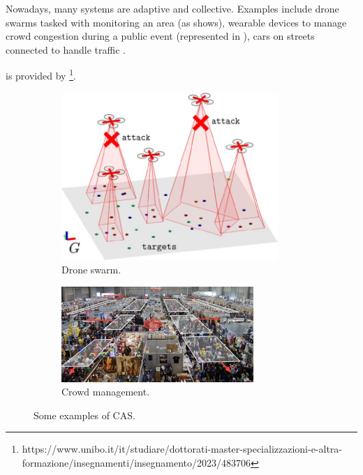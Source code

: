\documentclass[12pt,a4paper,openright,twoside]{book}
\begin{document}
Nowadays, many systems are adaptive and collective. Examples include drone swarms tasked with monitoring an area (as  shows),
wearable devices to manage crowd congestion during a public event (represented in ), cars on streets connected to handle traffic \cite{DBLP:journals/sttt/NicolaJW20}.

 is provided by \footnote{https://www.unibo.it/it/studiare/dottorati-master-specializzazioni-e-altra-formazione/insegnamenti/insegnamento/2023/483706}.

\begin{figure}[h]
  \centering
  \begin{subfigure}[b]{0.49\textwidth}
    \centering
    \includegraphics[width=0.9\textwidth]{figures/swarm2.jpeg}
    \caption{Drone swarm.}
    \label{fig:cas-examples-drone}
  \end{subfigure}

  \begin{subfigure}[b]{0.49\textwidth}
    \centering
    \includegraphics[width=0.8\textwidth]{figures/crowd.png}
    \caption{Crowd management.}
    \label{fig:cas-examples-crowd}
  \end{subfigure}
  \caption{Some examples of CAS.}
\end{figure}
\end{document}
